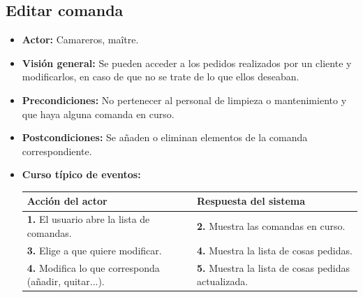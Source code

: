 \documentclass[spanish,a4paper,11pt, twoside]{report}	%
\begin{document}
		
	\subsection{Editar comanda}
			\begin{itemize}
			\item \textbf{Actor:} Camareros, maître.
			\item \textbf{Visión general:} Se pueden acceder a los pedidos realizados por un cliente y modificarlos, en caso de que no se trate de lo que ellos deseaban.
			\item \textbf{Precondiciones:} No pertenecer al personal de limpieza o mantenimiento y que haya alguna comanda en curso.
			\item \textbf{Postcondiciones:} Se añaden o eliminan elementos de la comanda correspondiente.
			\item \textbf{Curso típico de eventos:} 	\\
				\begin{tabular}{|p{6cm}||p{6cm}|}
				\hline
				\textbf{Acción del actor} & \textbf{Respuesta del sistema} \\ \hline \hline
				\textbf{1.} El usuario abre la lista de comandas. & \textbf{2.} Muestra las comandas en curso.\\ \hline 
				\textbf{3.} Elige a que quiere modificar. & \textbf{4.} Muestra la lista de cosas pedidas. \\ \hline
				\textbf{4.} Modifica lo que corresponda (añadir, quitar...). & \textbf{5.} Muestra la lista de cosas pedidas actualizada. \\ \hline
			\end{tabular}
		\end {itemize}


\end{document}

